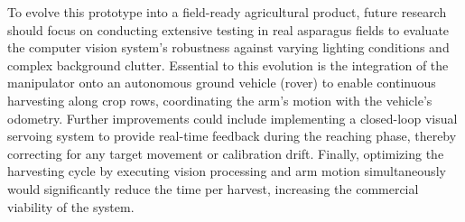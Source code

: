 To evolve this prototype into a field-ready agricultural product, future research should focus 
on conducting extensive testing in real asparagus fields to evaluate the computer vision 
system's robustness against varying lighting conditions and complex background clutter. 
Essential to this evolution is the integration of the manipulator onto an autonomous ground 
vehicle (rover) to enable continuous harvesting along crop rows, coordinating the arm's motion 
with the vehicle's odometry. Further improvements could include implementing a closed-loop 
visual servoing system to provide real-time feedback during the reaching phase, thereby 
correcting for any target movement or calibration drift. Finally, optimizing the harvesting 
cycle by executing vision processing and arm motion simultaneously would significantly reduce 
the time per harvest, increasing the commercial viability of the system.

